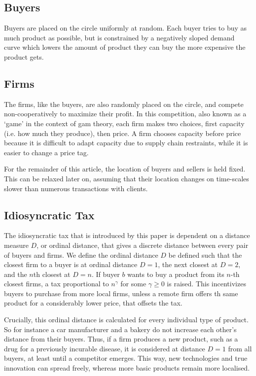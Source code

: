 \documentclass[final,3p,times,authoryear,12pt]{elsarticle}
\begin{document}
\subsection{Buyers}
Buyers are placed on the circle uniformly at random. 
Each buyer tries to buy as much product as possible, but is constrained by a negatively sloped demand curve which lowers the amount of product they can buy the more expensive the product gets.

\subsection{Firms}
The firms, like the buyers, are also randomly placed on the circle, and compete non-cooperatively to maximize their profit. 
In this competition, also known as a `game' in the context of gam theory, each firm makes two choices, first capacity (i.e. how much they produce), then price. 
A firm chooses capacity before price because it is difficult to adapt capacity due to supply chain restraints, while it is easier to change a price tag.

For the remainder of this article, the location of buyers and sellers is held fixed. 
This can be relaxed later on, assuming that their location changes on time-scales slower than numerous transactions with clients. 

\subsection{Idiosyncratic Tax}
The idiosyncratic tax that is introduced by this paper is dependent on a distance measure $D$, or ordinal distance, that gives a discrete distance between every pair of buyers and firms. 
We define the ordinal distance $D$ be defined such that the closest firm to a buyer is at ordinal distance $D=1$, the next closest at $D=2$, and the $n$th closest at $D=n$. 
If buyer $b$ wants to buy a product from its $n$-th closest firms, a tax proportional to $n^\gamma$ for some $\gamma \geqslant 0$ is raised. 
This incentivizes buyers to purchase from more local firms, unless a remote firm offers th same product for a considerably lower price, that offsets the tax. 

Crucially, this ordinal distance is calculated for every individual type of product. 
So for instance a car manufacturer and a bakery do not increase each other's distance from their buyers.
Thus, if a firm produces a new product, such as a drug for a previously incurable disease, it is considered at distance $D=1$ from all buyers, at least until a competitor emerges.
This way, new technologies and true innovation can spread freely, whereas more basic products remain more localised. 
\end{document}
